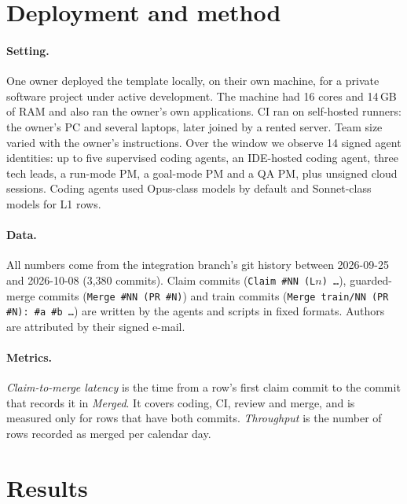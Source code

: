 \documentclass[11pt]{article}
\begin{document}
\section{Deployment and method}\label{sec:method}

\paragraph{Setting.} One owner deployed the template locally, on their own
machine, for a private software project under active development. The machine had 16 cores and 14\,GB of RAM and also ran the
owner's own applications. CI ran on self-hosted runners: the owner's PC and
several laptops, later joined by a rented server. Team size varied with the
owner's instructions. Over the window we observe 14 signed agent identities:
up to five supervised coding agents, an IDE-hosted coding agent, three tech
leads, a run-mode PM, a goal-mode PM and a QA PM, plus unsigned cloud sessions.
Coding agents used Opus-class models by default and Sonnet-class models for L1
rows.

\paragraph{Data.} All numbers come from the integration branch's git history
between 2026-09-25 and 2026-10-08 (3{,}380 commits). Claim commits
(\texttt{Claim \#NN (L$n$) \ldots}), guarded-merge commits
(\texttt{Merge \#NN (PR \#N)}) and train commits
(\texttt{Merge train/NN (PR \#N): \#a \#b \ldots}) are written by the agents and
scripts in fixed formats. Authors are attributed by their signed e-mail.

\paragraph{Metrics.} \emph{Claim-to-merge latency} is the time from a row's
first claim commit to the commit that records it in \emph{Merged}. It covers
coding, CI, review and merge, and is measured only for rows that have both
commits. \emph{Throughput} is the number of rows recorded as merged per
calendar day.

\section{Results}\label{sec:results}
\end{document}

